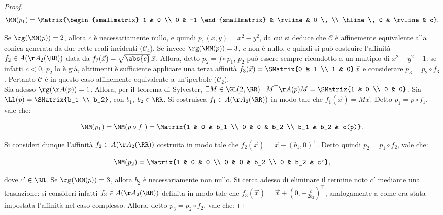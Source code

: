 \documentclass[11pt]{article}
\begin{document}
\begin{proof}
		\[ \MM(p_1) = \Matrix{\begin{smallmatrix}
				1 & 0 \\ 0 & -1
			\end{smallmatrix} & \rvline & 0 \, \\ \hline \, 0 & \rvline & c}. \]
		
		\vskip 0.05in
		
		Se $\rg(\MM(p)) = 2$, allora $c$ è necessariamente nullo, e quindi $p_1(x, y) = x^2 - y^2$, da cui
		si deduce che $\mathcal{C}$ è affinemente
		equivalente alla conica generata da due rette
		reali incidenti ($\mathcal{C}_4$). Se invece
		$\rg(\MM(p)) = 3$, $c$ non è nullo, e quindi
		si può costruire l'affinità $f_2 \in A(\AA_2(\RR))$
		data da $f_2(\vec x) = \sqrt{\abs{c}} \, \vec x$. Allora, detto $p_2 = f \circ p_1$, $p_2$ può essere
		sempre ricondotto a un
		multiplo di $x^2 - y^2 - 1$: se infatti $c < 0$,
		$p_2$ lo è già, altrimenti è sufficiente applicare
		una terza affinità $f_3(\vec x) = \SMatrix{0 & 1 \\ 1 & 0} \, \vec x$ e considerare $p_3 = p_2 \circ f_3$. Pertanto $\mathcal{C}$ è in questo caso
		affinemente equivalente a un'iperbole ($\mathcal{C}_2$). \\
		
		Sia adesso $\rg(\AA(p)) = 1$. Allora, per il teorema
		di Sylvester, $\exists M \in \GL(2, \RR) \mid M^\top \AA(p) M = \SMatrix{1 & 0 \\ 0 & 0}$. Sia $\Ll(p) = \SMatrix{b_1 \\ b_2}$, con $b_1$, $b_2 \in \RR$. Si costruisca $f_1 \in A(\AA_2(\RR))$ in modo tale
		che $f_1(\vec x) = M \vec x$. Detto
		$p_1 = p \circ f_1$, vale che:
		
		\[ \MM(p_1) = \MM(p \circ f_1) = \Matrix{1 & 0 & b_1 \\ 0 & 0 & b_2 \\ b_1 & b_2 & c(p)}. \]
		
		\vskip 0.1in
		
		Si consideri dunque l'affinità $f_2 \in A(\AA_2(\RR))$ costruita in modo tale che
		$f_2(\vec x) = \vec x - (b_1, 0)^\top$. Detto
		quindi $p_2 = p_1 \circ f_2$, vale che:
		
		\[ \MM(p_2) = \Matrix{1 & 0 & 0 \\ 0 & 0 & b_2 \\ 0 & b_2 & c'}, \]
		
		\vskip 0.07in
		
		dove $c' \in \RR$. Se $\rg(\MM(p)) = 3$, allora $b_2$ è necessariamente
		non nullo. Si cerca adesso di eliminare
		il termine noto $c'$ mediante una traslazione:
		si consideri infatti $f_3 \in A(\AA_2(\RR))$ definita in modo tale che $f_3(\vec x) = \vec x + (0, -\frac{c}{2 b_2})^\top$, analogamente a come
		era stata impostata l'affinità nel caso complesso.
		Allora, detto $p_3 = p_2 \circ f_2$, vale che:
		

\end{proof}
\end{document}
